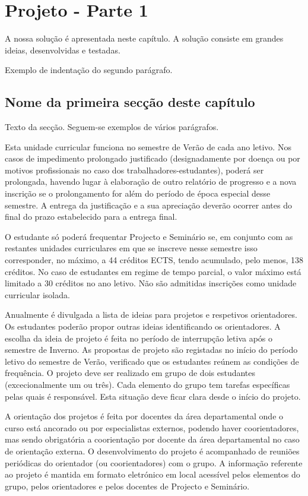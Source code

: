\chapter{Projeto - Parte 1} \label{ch:projeto-parte1}

A nossa solução é apresentada neste capítulo. A solução consiste em grandes ideias, desenvolvidas e testadas.

Exemplo de indentação do segundo parágrafo.


\section{Nome da primeira secção deste capítulo} \label{sec31}
Texto da secção. Seguem-se exemplos de vários parágrafos.

Esta unidade curricular funciona no semestre de Verão de cada ano letivo. Nos casos de impedimento prolongado justificado (designadamente por doença ou por motivos profissionais no caso dos trabalhadores-estudantes), poderá ser prolongada, havendo lugar à elaboração de outro relatório de progresso
e a nova inscrição se o prolongamento for além do período de época especial desse semestre. A entrega da justificação e a sua apreciação deverão ocorrer antes do final do prazo estabelecido para a entrega final.

O estudante só poderá frequentar Projecto e Seminário se, em conjunto com as restantes unidades curriculares em que se inscreve nesse semestre isso corresponder, no máximo, a 44 créditos ECTS, tendo acumulado, pelo menos, 138 créditos. No caso de estudantes em regime de tempo parcial, o valor máximo
está limitado a 30 créditos no ano letivo. Não são admitidas inscrições como unidade curricular isolada.

Anualmente é divulgada a lista de ideias para projetos e respetivos orientadores. Os estudantes poderão propor outras ideias identificando os orientadores. A escolha da ideia de projeto é feita no período de
interrupção letiva após o semestre de Inverno. As propostas de projeto são registadas no início do período letivo do semestre de Verão, verificado que os estudantes reúnem as condições de frequência.
O projeto deve ser realizado em grupo de dois estudantes (excecionalmente um ou três). Cada elemento do grupo tem tarefas específicas pelas quais é responsável. Esta situação deve ficar clara desde o início do projeto.

A orientação dos projetos é feita por docentes da área departamental onde o curso está ancorado ou por especialistas externos, podendo haver coorientadores, mas sendo obrigatória a coorientação por docente da área departamental no caso de orientação externa. O desenvolvimento do projeto é acompanhado de reuniões periódicas do orientador (ou coorientadores) com o grupo. A informação referente ao projeto é mantida em formato eletrónico em local acessível pelos elementos do grupo, pelos orientadores e pelos docentes de Projecto e Seminário.\\

